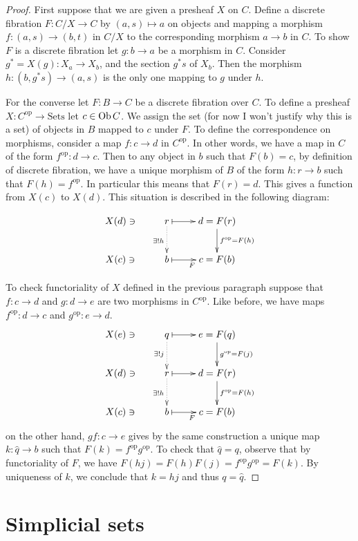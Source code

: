 \begin{proof}
First suppose that we are given a presheaf $X$ on $C$. Define a discrete
fibration $F:C/X \to C$ by $(a,s)\mapsto a$ on objects and
mapping a morphism $f:(a,s)\to (b,t)$ in $C/X$ to the
corresponding morphism $a \to b$ in $C$.
To show $F$ is a discrete fibration 
let $g:b\to a$ be a morphism in $C$. 
Consider $g^*=X(g):X_a\to X_b$,
and the section $g^*s$ of $X_b$.
Then the
morphism $h:(b,g^*s)\to (a,s)$ is the only one mapping to $g$ under $h$.

For the converse let $F:B \to C$ be a discrete fibration over $C$.
To define a presheaf $X:C^{\text{op}}\to \text{Sets}$ let $c \in \mathop{\mathrm{Ob}}\nolimits C$.
We assign the set (for now I won't justify why this is a set)
of objects in $B$ mapped to $c$ under $F$.
To define the correspondence on morphisms, 
consider a map $f:c \to d$ in $C^{\text{op}}$.
In other words, we have a map in  $C$ of the form $f^{\text{op}}:d \to c$.
Then to any object in $b$ such that $F(b)=c$,
by definition of discrete fibration,
we have a unique morphism of $B$ of the form
$h:r \to b$ such that $F(h)=f^{\text{op}}$.
In particular this means that $F(r)=d$.
This gives a function from $X(c)$ to $X(d)$.
This situation is described in the following diagram:

$$
\xymatrix{
X(d)\ni&r \ar@{.>}[d]_{\exists!h}\ar@{|->}[r]& d=F(r)
\ar[d]^{f^{\text{op}}=F(h)}\\
X(c)\ni& b\ar@{|->}[r]_F&c=F(b)
}
$$




To check functoriality of $X$ defined in the previous paragraph
suppose that $f:c\to d$ and $g:d\to e$ are two morphisms in $C^{\text{op}}$.
Like before, we have maps $f^{\text{op}}:d\to c$ and $g^{\text{op}}:e \to d$.
$$
\xymatrix{
X(e)\ni& q\ar@{.>}[d]_{\exists !j}\ar@{|->}[r]& e=F(q)
\ar[d]^{g^{\text{op}}=F(j)}\\
X(d)\ni&r \ar@{.>}[d]_{\exists!h}\ar@{|->}[r]& d=F(r)
\ar[d]^{f^{\text{op}}=F(h)}\\
X(c)\ni& b\ar@{|->}[r]_F&c=F(b)
}
$$
on the other hand, $gf:c \to e$ gives by the
same construction a unique map $k:\hat{q}  \to b$
such that $F(k)=f^{\text{op}}g^{\text{op}}$.
To check that $\hat{q}=q$, observe that
by functoriality of $F$, we have
$F(hj)=F(h)F(j)=f^{\text{op}}g^{\text{op}}=F(k)$.
By uniqueness of $k$, we conclude that
$k=hj$ and thus $q=\hat{q}$.
\end{proof}

\section{Simplicial sets}
\label{section-simplicial-sets}

